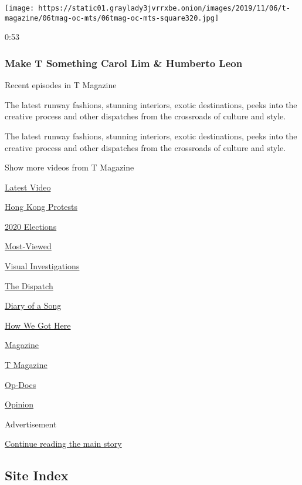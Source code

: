 \begin{itemize}
  \texttt{[image: https://static01.graylady3jvrrxbe.onion/images/2019/11/06/t-magazine/06tmag-oc-mts/06tmag-oc-mts-square320.jpg]}

  0:53

  \hypertarget{make-t-something--carol-lim--humberto-leon}{%
  \subsubsection{Make T Something \textbar{} Carol Lim \& Humberto
  Leon}\label{make-t-something--carol-lim--humberto-leon}}
\end{itemize}

Recent episodes in T Magazine

The latest runway fashions, stunning interiors, exotic destinations,
peeks into the creative process and other dispatches from the crossroads
of culture and style.

The latest runway fashions, stunning interiors, exotic destinations,
peeks into the creative process and other dispatches from the crossroads
of culture and style.

Show more videos from T Magazine

\href{/video}{}

\href{/video/latest-video}{Latest Video}

\href{/video/hk-protest}{Hong Kong Protests}

\href{/video/2020-Elections}{2020 Elections}

\href{/video/Most-Viewed}{Most-Viewed}

\href{/video/investigations}{Visual Investigations}

\href{/video/on-the-ground}{The Dispatch}

\href{/video/diaryofasong}{Diary of a Song}

\href{/video/how-we-got-here}{How We Got Here}

\href{/video/magazine}{Magazine}

\href{/video/t-magazine}{T Magazine}

\href{/video/op-docs}{Op-Docs}

\href{/video/opinion}{Opinion}

Advertisement

\protect\hyperlink{after-bottom}{Continue reading the main story}

\hypertarget{site-index}{%
\subsection{Site Index}\label{site-index}}

